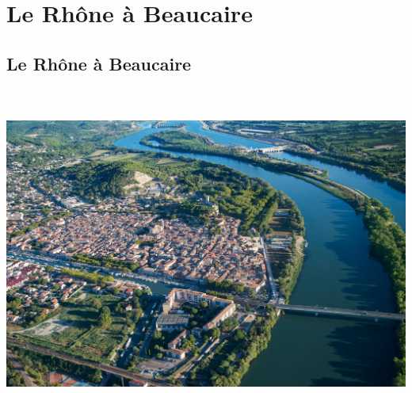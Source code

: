 \documentclass[compress,9pt]{beamer}
\begin{document}
\section{Le Rhône à Beaucaire}
	\subsection{Le Rhône à Beaucaire}
	{
    \begin{frame}
        \begin{center}
				\textcolor{white}{\Large \textbf{Le Rhône à Beaucaire}}\\
		 		\vspace{0.3cm}
		 		\textcolor{white}{\large \textbf{Collecte et caractérisation des données de crue}}\\
		 		\vspace{0.8cm}
		 		\includegraphics[width = .7\textwidth]{./Figures/BcrAerien.jpg} 
        \end{center}
    \end{frame}
    }
    	
\end{document}
